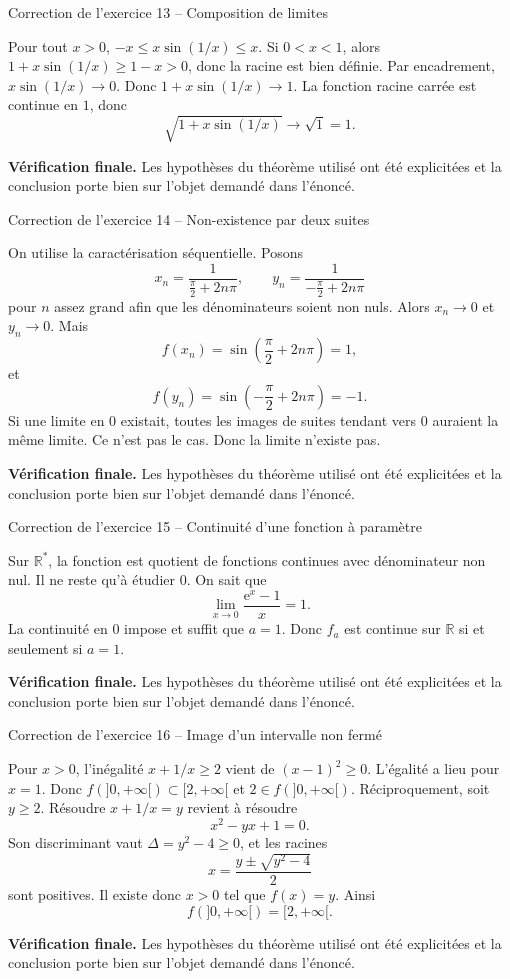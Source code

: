 \documentclass[11pt,a4paper]{article}
\newcommand{\R}{\mathbb{R}}
\newcommand{\e}{\mathrm{e}}
\begin{document}
\begin{corrbox}{Correction de l'exercice 13 -- Composition de limites}

Pour tout $x>0$, $-x\leq x\sin(1/x)\leq x$. Si $0<x<1$, alors $1+x\sin(1/x)\geq1-x>0$, donc la racine est bien définie. Par encadrement, $x\sin(1/x)\to0$. Donc $1+x\sin(1/x)\to1$. La fonction racine carrée est continue en $1$, donc
\[
\sqrt{1+x\sin(1/x)}\to\sqrt1=1.
\]

\medskip
\textbf{Vérification finale.} Les hypothèses du théorème utilisé ont été explicitées et la conclusion porte bien sur l'objet demandé dans l'énoncé.
\end{corrbox}


\begin{corrbox}{Correction de l'exercice 14 -- Non-existence par deux suites}

On utilise la caractérisation séquentielle. Posons
\[
x_n=\frac1{\frac\pi2+2n\pi},\qquad y_n=\frac1{-\frac\pi2+2n\pi}
\]
pour $n$ assez grand afin que les dénominateurs soient non nuls. Alors $x_n\to0$ et $y_n\to0$. Mais
\[
f(x_n)=\sin\left(\frac\pi2+2n\pi\right)=1,
\]
et
\[
f(y_n)=\sin\left(-\frac\pi2+2n\pi\right)=-1.
\]
Si une limite en $0$ existait, toutes les images de suites tendant vers $0$ auraient la même limite. Ce n'est pas le cas. Donc la limite n'existe pas.

\medskip
\textbf{Vérification finale.} Les hypothèses du théorème utilisé ont été explicitées et la conclusion porte bien sur l'objet demandé dans l'énoncé.
\end{corrbox}


\begin{corrbox}{Correction de l'exercice 15 -- Continuité d'une fonction à paramètre}

Sur $\R^*$, la fonction est quotient de fonctions continues avec dénominateur non nul. Il ne reste qu'à étudier $0$. On sait que
\[
\lim_{x\to0}\frac{\e^x-1}{x}=1.
\]
La continuité en $0$ impose et suffit que $a=1$. Donc $f_a$ est continue sur $\R$ si et seulement si $a=1$.

\medskip
\textbf{Vérification finale.} Les hypothèses du théorème utilisé ont été explicitées et la conclusion porte bien sur l'objet demandé dans l'énoncé.
\end{corrbox}


\begin{corrbox}{Correction de l'exercice 16 -- Image d'un intervalle non fermé}

Pour $x>0$, l'inégalité $x+1/x\geq2$ vient de $(x-1)^2\geq0$. L'égalité a lieu pour $x=1$. Donc $f(]0,+\infty[)\subset[2,+\infty[$ et $2\in f(]0,+\infty[)$. Réciproquement, soit $y\geq2$. Résoudre $x+1/x=y$ revient à résoudre
\[
x^2-yx+1=0.
\]
Son discriminant vaut $\Delta=y^2-4\geq0$, et les racines
\[
x=\frac{y\pm\sqrt{y^2-4}}2
\]
sont positives. Il existe donc $x>0$ tel que $f(x)=y$. Ainsi
\[
f(]0,+\infty[)=[2,+\infty[.
\]

\medskip
\textbf{Vérification finale.} Les hypothèses du théorème utilisé ont été explicitées et la conclusion porte bien sur l'objet demandé dans l'énoncé.
\end{corrbox}
\end{document}

